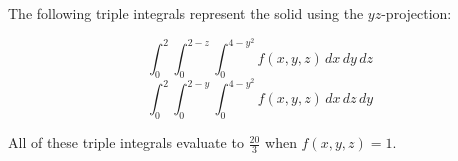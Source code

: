 \documentclass{amsart}
\newcommand{\ds}{\displaystyle}
\theoremstyle{definition}
\begin{document}
The following triple integrals represent the solid using the $yz$-projection:

\[\int_{0}^{2}\int_{0}^{2-z}\int_{0}^{4-y^2} f(x,y,z) \,dx \,dy \,dz\]
\[\int_{0}^{2}\int_{0}^{2-y}\int_{0}^{4-y^2} f(x,y,z) \,dx \,dz \,dy\]

\vspace{1em}
All of these triple integrals evaluate to $\frac{20}{3}$  when $f(x,y,z) = 1$.

\end{document}
